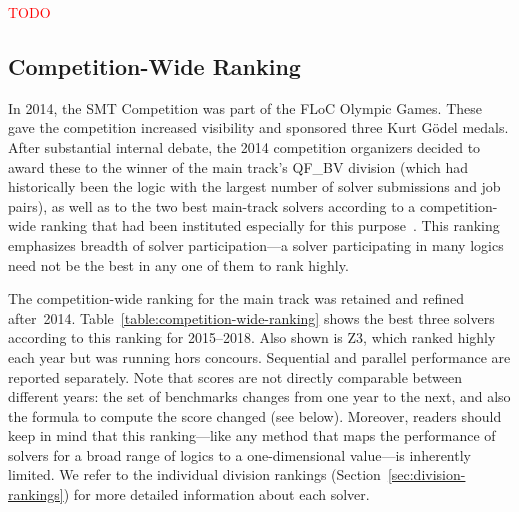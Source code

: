 \documentclass[twoside,11pt]{article}
\newcommand{\TODO}[0]{\textcolor{red}{TODO}}
\begin{document}






\TODO


\subsection{Competition-Wide Ranking}
\label{sec:floc}

In 2014, the SMT Competition was part of the FLoC Olympic Games.
These gave the competition increased visibility and sponsored three
Kurt G\"odel medals.  After substantial internal debate, the 2014
competition organizers decided to award these to the winner of the
main track's QF\_BV division (which had historically been the logic
with the largest number of solver submissions and job pairs), as well
as to the two best main-track solvers according to a competition-wide
ranking that had been instituted especially for this
purpose~\cite{CDW14}.  This ranking emphasizes breadth of solver
participation---a solver participating in many logics need not be the
best in any one of them to rank highly.

The competition-wide ranking for the main track was retained and
refined after~2014.  Table~\ref{table:competition-wide-ranking} shows
the best three solvers according to this ranking for 2015--2018.  Also
shown is Z3, which ranked highly each year but was running hors
concours.  Sequential and parallel performance are reported
separately.
%
Note that scores are not directly comparable between different years:
the set of benchmarks changes from one year to the next, and also the
formula to compute the score changed (see below).  Moreover, readers
should keep in mind that this ranking---like any method that maps the
performance of solvers for a broad range of logics to a
one-dimensional value---is inherently limited.  We refer to the
individual division rankings (Section~\ref{sec:division-rankings}) for
more detailed information about each solver.
\end{document}
